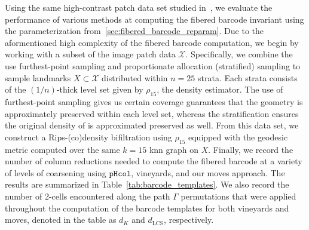 \documentclass{article} %
\begin{document}
Using the same high-contrast patch data set studied in~\cite{lee2003nonlinear}, we evaluate the performance of various methods at computing the fibered barcode invariant using the parameterization from~\ref{sec:fibered_barcode_reparam}. 
Due to the aformentioned high complexity of the fibered barcode computation, we begin by working with a subset of the image patch data $\mathcal{X}$. Specifically, we combine the use furthest-point sampling and proportionate allocation (stratified) sampling to sample landmarks $X \subset \mathcal{X}$ distributed within $n = 25$ strata. Each strata consists of the $(1/n)$-thick level set given by $\rho_{15}$, the density estimator. The use of furthest-point sampling gives us certain coverage guarantees that the geometry is approximately preserved within each level set, whereas the stratification ensures the original density of is approximated preserved as well. From this data set, we construct a Rips-(co)density bifiltration using $\rho_{15}$ equipped with the geodesic metric computed over the same $k = 15$ knn graph on $X$. 
Finally, we record the number of column reductions needed to compute the fibered barcode at a variety of levels of coarsening using $\mathtt{pHcol}$, vineyards, and our moves approach. The results are summarized in Table~\ref{tab:barcode_templates}. We also record the number of 2-cells encountered along the path $\Gamma$ permutations that were applied throughout the computation of the barcode templates for both vineyards and moves, denoted in the table as $d_K$ and $d_{\mathrm{LCS}}$, respectively. 
\end{document}
